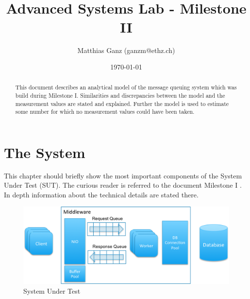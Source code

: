 \documentclass[a4paper]{article}
\title{Advanced Systems Lab - Milestone II}
\author{Matthias Ganz (ganzm@ethz.ch)}
\date{\today}
\begin{document}
\maketitle

\pagebreak

\tableofcontents

\pagebreak

\begin{abstract}

This document describes an analytical model of the message queuing system which was build during Milestone I.  Similarities and discrepancies between the model and the measurement values are stated and explained. Further the model is used to estimate some number for which no measurement values could have been taken.

\end{abstract}

\pagebreak

\section{The System}

This chapter should briefly show the most important components of the System Under Test (SUT). The curious reader is referred to the document Milestone I \cite{milestone1}. In depth information about the technical details are stated there.



\begin{figure}[H]
	\begin{center}
    \includegraphics[scale=0.6]{../drawings/broker-threading.png}
  \end{center}
  \caption{System Under Test}
  \label{fig:sut}
\end{figure}

\end{document}
